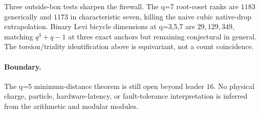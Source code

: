 Three outside-box tests sharpen the firewall.  The q=7 root-coset ranks are $1183$ generically and $1173$ in characteristic seven, killing the naive cubic native-drop extrapolation.  Binary Levi bicycle dimensions at q=3,5,7 are $29,129,349$, matching $q^3+q-1$ at three exact anchors but remaining conjectural in general.  The torsion/triality identification above is equivariant, not a count coincidence.

\paragraph{Boundary.}
The q=5 minimum-distance theorem is still open beyond leader $16$.  No physical charge, particle, hardware-latency, or fault-tolerance interpretation is inferred from the arithmetic and modular modules.
\fi
%
